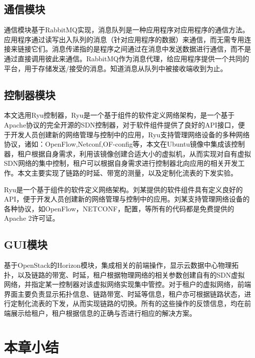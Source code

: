 \subsection{通信模块}
通信模块基于RabbitMQ实现，消息队列是一种应用程序对应用程序的通信方法。应用程序通过读写出入队列的消息（针对应用程序的数据）来通信，而无需专用连接来链接它们。消息传递指的是程序之间通过在消息中发送数据进行通信，而不是通过直接调用彼此来通信。RabbitMQ作为消息代理，给应用程序提供一个共同的平台，用于存储发送/接受的消息。知道消息从队列中被接收端收到为止。

\subsection{控制器模块}
本文选用Ryu控制器，Ryu是一个基于组件的软件定义网络架构，是一个基于Apache协议的完全开源的SDN控制器，对于软件组件提供了良好的API接口，便于开发人员创建新的网络管理与控制中的应用，Ryu支持管理网络设备的多种网络协议，诸如：OpenFlow,Netconf,OF-config等，本文在Ubuntu镜像中集成该控制器，租户根据自身需求，利用该镜像创建合适大小的虚拟机，从而实现对自有虚拟SDN网络的集中控制，租户可以根据自身需求进行控制器北向应用的相关开发工作。本文主要实现了链路的时延、带宽的测量，以及定制化流表的下发实验。

Ryu是一个基于组件的软件定义网络架构。刘某提供的软件组件具有定义良好的API，便于开发人员创建新的网络管理与控制中的应用。刘某支持管理网络设备的各种协议，如OpenFlow，NETCONF，配置，等所有的代码都是免费提供的Apache 2许可证。

\subsection{GUI模块}
基于OpenStack的Horizon模块，集成相关的前端操作，显示云数据中心物理拓扑，以及链路的带宽、时延，租户根据物理网络的相关参数创建自有的SDN虚拟网络，并指定某一控制器对该虚拟网络实现集中管控。对于租户的虚拟网络，前端界面主要负责显示拓扑信息、链路带宽、时延等信息，租户亦可根据链路状态，进行定制化流表的下发，从而实现链路的切换。所有的这些操作的反馈信息，均在前端展示给租户，租户根据信息的正确与否进行相应的解决方案。
\section{本章小结}